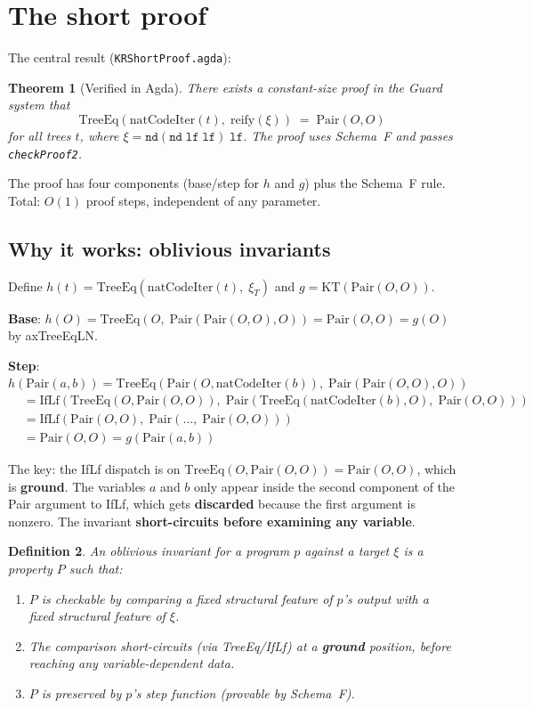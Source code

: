 \documentclass[11pt]{article}
\newtheorem{theorem}{Theorem}
\newtheorem{definition}[theorem]{Definition}
\begin{document}
\section{The short proof}

The central result (\texttt{KRShortProof.agda}):

\begin{theorem}[Verified in Agda]
There exists a constant-size proof in the Guard system that
$$\mathrm{TreeEq}(\mathrm{natCodeIter}(t),\; \mathrm{reify}(\xi)) \;=\; \mathrm{Pair}(O, O)$$
for all trees $t$, where $\xi = \mathtt{nd}(\mathtt{nd}\;\mathtt{lf}\;\mathtt{lf})\;\mathtt{lf}$. The proof uses Schema~F and passes \texttt{checkProof2}.
\end{theorem}

The proof has four components (base/step for $h$ and $g$) plus the Schema~F rule. Total: $O(1)$ proof steps, independent of any parameter.

\subsection{Why it works: oblivious invariants}

Define $h(t) = \mathrm{TreeEq}(\mathrm{natCodeIter}(t),\; \xi_T)$ and $g = \mathrm{KT}(\mathrm{Pair}(O,O))$.

\textbf{Base}: $h(O) = \mathrm{TreeEq}(O,\; \mathrm{Pair}(\mathrm{Pair}(O,O), O)) = \mathrm{Pair}(O,O) = g(O)$ by axTreeEqLN.

\textbf{Step}: $h(\mathrm{Pair}(a,b)) = \mathrm{TreeEq}(\mathrm{Pair}(O, \mathrm{natCodeIter}(b)),\; \mathrm{Pair}(\mathrm{Pair}(O,O), O))$
\begin{align*}
&= \mathrm{IfLf}(\mathrm{TreeEq}(O, \mathrm{Pair}(O,O)),\; \mathrm{Pair}(\mathrm{TreeEq}(\mathrm{natCodeIter}(b), O),\; \mathrm{Pair}(O,O))) \\
&= \mathrm{IfLf}(\mathrm{Pair}(O,O),\; \mathrm{Pair}(\ldots,\; \mathrm{Pair}(O,O))) \\
&= \mathrm{Pair}(O,O) = g(\mathrm{Pair}(a,b))
\end{align*}

The key: the IfLf dispatch is on $\mathrm{TreeEq}(O, \mathrm{Pair}(O,O)) = \mathrm{Pair}(O,O)$, which is \textbf{ground}. The variables $a$ and $b$ only appear inside the second component of the Pair argument to IfLf, which gets \textbf{discarded} because the first argument is nonzero. The invariant \textbf{short-circuits before examining any variable}.

\begin{definition}
An \emph{oblivious invariant} for a program $p$ against a target $\xi$ is a property $P$ such that:
\begin{enumerate}
\item $P$ is checkable by comparing a fixed structural feature of $p$'s output with a fixed structural feature of $\xi$.
\item The comparison short-circuits (via TreeEq/IfLf) at a \textbf{ground} position, before reaching any variable-dependent data.
\item $P$ is preserved by $p$'s step function (provable by Schema~F).
\end{enumerate}
\end{definition}
\end{document}

